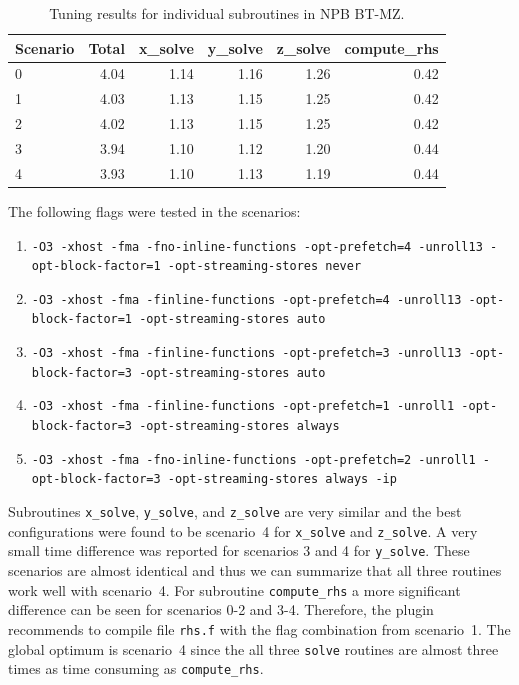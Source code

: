 \begin{table}
    \centering
    \begin{tabular}{|l | r| r | r | r |r |}
    \hline
     Scenario & Total & x\_solve & y\_solve & z\_solve & compute\_rhs \\
    \hline\hline
    0	& 4.04 & 1.14 & 1.16 & 1.26 & 0.42\\[1ex]
    1	& 4.03 & 1.13 & 1.15 & 1.25 & 0.42\\[1ex]
    2	& 4.02 & 1.13 & 1.15 & 1.25 & 0.42\\[1ex]
    3	& 3.94 & 1.10 & 1.12 & 1.20 & 0.44\\[1ex]
    4	& 3.93 & 1.10 & 1.13 & 1.19 & 0.44\\[1ex]\hline
    \end{tabular}
    \caption{Tuning results for individual subroutines in NPB BT-MZ.}
\label{tab:cfs-routine}
\end{table}

The following flags were tested in the scenarios:

\begin{enumerate}
  \item {\tt -O3  -xhost        -fma  -fno-inline-functions -opt-prefetch=4 -unroll13 -opt-block-factor=1  -opt-streaming-stores never}
  \item {\tt -O3  -xhost        -fma  -finline-functions -opt-prefetch=4 -unroll13 -opt-block-factor=1  -opt-streaming-stores auto}
  \item {\tt -O3  -xhost        -fma  -finline-functions -opt-prefetch=3 -unroll13 -opt-block-factor=3  -opt-streaming-stores auto}
  \item {\tt -O3  -xhost        -fma  -finline-functions -opt-prefetch=1 -unroll1 -opt-block-factor=3  -opt-streaming-stores always}
  \item {\tt -O3  -xhost        -fma  -fno-inline-functions -opt-prefetch=2 -unroll1 -opt-block-factor=3  -opt-streaming-stores always  -ip}
\end{enumerate}

Subroutines {\tt x\_solve}, {\tt y\_solve}, and {\tt z\_solve} are very similar and the best configurations were found to be scenario~4 for {\tt x\_solve} and {\tt z\_solve}. A very small time difference was reported for scenarios 3 and 4 for {\tt y\_solve}. These scenarios are almost identical and thus we can summarize that all three routines work well with scenario~4. For subroutine {\tt compute\_rhs} a more significant difference can be seen for scenarios 0-2 and 3-4. Therefore, the plugin recommends to compile file {\tt rhs.f} with the flag combination from scenario~1. The global optimum is scenario~4 since the all three {\tt solve} routines are almost three times as time consuming as {\tt compute\_rhs}.

